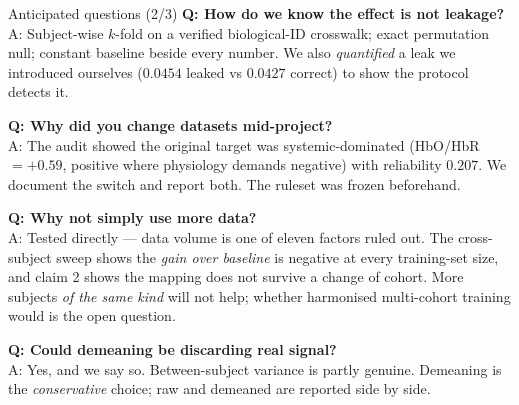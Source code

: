 \documentclass[aspectratio=169,11pt]{beamer}
\begin{document}
\begin{frame}{Anticipated questions (2/3)}
\small
\textbf{Q: How do we know the effect is not leakage?}\\
A: Subject-wise $k$-fold on a verified biological-ID crosswalk; exact permutation
null; constant baseline beside every number. We also \emph{quantified} a leak we
introduced ourselves ($0.0454$ leaked vs $0.0427$ correct) to show the protocol
detects it.

\vspace{0.5em}
\textbf{Q: Why did you change datasets mid-project?}\\
A: The audit showed the original target was systemic-dominated (HbO/HbR $=+0.59$,
positive where physiology demands negative) with reliability $0.207$. We document
the switch and report both. The ruleset was frozen beforehand.

\vspace{0.5em}
\textbf{Q: Why not simply use more data?}\\
A: Tested directly --- data volume is one of eleven factors ruled out. The
cross-subject sweep shows the \emph{gain over baseline} is negative at every
training-set size, and claim 2 shows the mapping does not survive a change of
cohort. More subjects \emph{of the same kind} will not help; whether harmonised
multi-cohort training would is the open question.

\vspace{0.5em}
\textbf{Q: Could demeaning be discarding real signal?}\\
A: Yes, and we say so. Between-subject variance is partly genuine. Demeaning is
the \emph{conservative} choice; raw and demeaned are reported side by side.
\end{frame}
\end{document}
